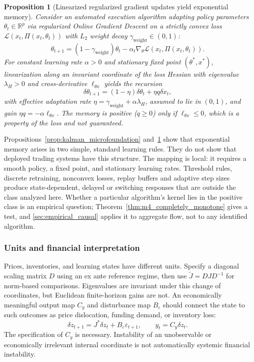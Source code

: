 \documentclass[10pt,twocolumn,letterpaper]{article}
\newtheorem{proposition}[theorem]{Proposition}
\theoremstyle{definition}
\theoremstyle{remark}
\begin{document}
\begin{proposition}[Linearized regularized gradient updates yield exponential memory]
\label{prop:ogd_microfoundation}
Consider an automated execution algorithm adapting policy parameters $\theta_t \in \mathbb{R}^p$ via regularized Online Gradient Descent on a strictly convex loss $\mathcal{L}(x_t, \Pi(x_t, \theta_t))$ with $L_2$ weight decay $\gamma_{\mathrm{weight}} \in (0, 1)$:
\begin{equation}
 \theta_{t+1} = (1 - \gamma_{\mathrm{weight}}) \theta_t - \alpha_t \nabla_\theta \mathcal{L}(x_t, \Pi(x_t, \theta_t)).
 \label{eq:rl_update}
\end{equation}
For constant learning rate $\alpha > 0$ and stationary fixed point $(\theta^*, x^*)$, linearization along an invariant coordinate of the loss Hessian with eigenvalue $\lambda_H > 0$ and cross-derivative $\ell_{\theta x}$ yields the recursion
\begin{equation}
 \delta \theta_{t+1} = (1 - \eta) \delta \theta_t + \eta q \delta x_t,
\end{equation}
with effective adaptation rate $\eta = \gamma_{\mathrm{weight}} + \alpha \lambda_H$, assumed to lie in $(0, 1)$, and gain $\eta q = -\alpha \ell_{\theta x}$. The memory is positive ($q\ge0$) only if $\ell_{\theta x}\le0$, which is a property of the loss and not guaranteed.
\end{proposition}

Propositions~\ref{prop:kalman_microfoundation} and~\ref{prop:ogd_microfoundation} show that exponential memory arises in two simple, standard learning rules. They do not show that deployed trading systems have this structure. The mapping is local: it requires a smooth policy, a fixed point, and stationary learning rates. Threshold rules, discrete retraining, nonconvex losses, replay buffers and adaptive step sizes produce state-dependent, delayed or switching responses that are outside the class analyzed here. Whether a particular algorithm's kernel lies in the positive class is an empirical question; Theorem~\ref{thm:m4_completely_monotone} gives a test, and \cref{sec:empirical_causal} applies it to aggregate flow, not to any identified algorithm.

\subsubsection{Units and financial interpretation}
Prices, inventories, and learning states have different units. Specify a diagonal scaling matrix $D$ using an ex ante reference regime, then use $\widetilde J=D J D^{-1}$ for norm-based comparisons. Eigenvalues are invariant under this change of coordinates, but Euclidean finite-horizon gains are not. An economically meaningful output map $C_y$ and disturbance map $B_\varepsilon$ should connect the state to such outcomes as price dislocation, funding demand, or inventory loss:
\begin{equation}
 \delta z_{t+1}=J^*\delta z_t+B_\varepsilon\varepsilon_{t+1},\qquad
 y_t=C_y\delta z_t.
 \label{eq:linear}
\end{equation}
The specification of $C_y$ is necessary. Instability of an unobservable or economically irrelevant internal coordinate is not automatically systemic financial instability.
\end{document}
